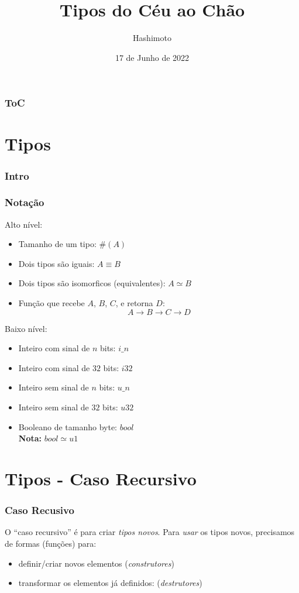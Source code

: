 \documentclass{beamer}
\title{Tipos do Céu ao Chão}
\author{Hashimoto}
\date{17 de Junho de 2022}
\newcommand{\nota}[1]{\textbf{Nota:}\textit{ #1}}
\newcommand{\typetam}{\#}
\newcommand{\typeeq}{\equiv}
\newcommand{\typesim}{\simeq}
\begin{document}
\begin{frame}
    \titlepage
\end{frame}

\begin{frame}
    \frametitle{ToC}
    \tableofcontents[hideallsubsections]
\end{frame}

\section{Tipos}
\begin{frame}
    \frametitle{Intro}
\end{frame}

\begin{frame}
    \frametitle{Notação}
    Alto nível:
    \begin{itemize}
        \item Tamanho de um tipo: \(\typetam(A)\)
        \item Dois tipos são iguais: \( A \typeeq B \)
        \item Dois tipos são isomorficos (equivalentes):
            \( A \typesim B \)
        \item Função que recebe \(A\), \(B\), \(C\),
            e retorna \(D\): \[ A \to B \to C \to D \]
    \end{itemize}

    Baixo nível:
    \begin{itemize}
        \item Inteiro com sinal de \(n\) bits: \(i\_n\)
        \item Inteiro com sinal de \(32\) bits: \(i32\)
        \item Inteiro sem sinal de \(n\) bits: \(u\_n\)
        \item Inteiro sem sinal de \(32\) bits: \(u32\)
        \item Booleano de tamanho byte: \(bool\)
            \\\nota{\(bool \typesim u1\)}
    \end{itemize}
\end{frame}

\section{Tipos - Caso Recursivo}
\begin{frame}
    \frametitle{Caso Recusivo}
    O ``caso recursivo'' é para criar \emph{tipos novos}.
    \vfill
    Para \emph{usar} os tipos novos,
    precisamos de formas (funções) para:
    \begin{itemize}
        \item definir/criar novos elementos
            (\emph{construtores})
        \item transformar os elementos já definidos:
            (\emph{destrutores})
    \end{itemize}
\end{frame}
\end{document}
